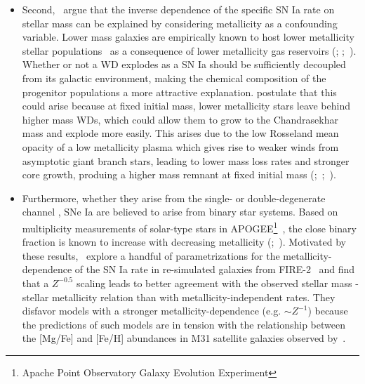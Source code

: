 \documentclass[ms.tex]{subfiles}
\begin{document}
\begin{itemize}
	\item Second,~\citet{Kistler2013} argue that the inverse dependence of the
	specific SN Ia rate on stellar mass can be explained by considering
	metallicity as a confounding variable.
	Lower mass galaxies are empirically known to host lower metallicity stellar
	populations~\citep{Gallazzi2005, Kirby2013} as a consequence of lower
	metallicity gas reservoirs (\citealp{Tremonti2004, Andrews2013};
	\citealp*{Zahid2011};~\citealp{Zahid2014}).
	Whether or not a WD explodes as a SN Ia should be sufficiently decoupled
	from its galactic environment, making the chemical composition of the
	progenitor populations a more attractive explanation.
	\citet{Kistler2013} postulate that this could arise because at fixed
	initial mass, lower metallicity stars leave behind higher mass WDs, which
	could allow them to grow to the Chandrasekhar mass and explode more easily.
	This arises due to the low Rosseland mean opacity of a low metallicity
	plasma which gives rise to weaker winds from asymptotic giant branch stars,
	leading to lower mass loss rates and stronger core growth, produing a
	higher mass remnant at fixed initial mass (\citealp{Umeda1999, Willson2000,
	Marigo2007};~\citealp*{Meng2008};~\citealp{Zhao2012, Kalirai2014}).

	\item Furthermore, whether they arise from the single-
	\citep[e.g.][]{Whelan1973} or double-degenerate channel
	\citep[e.g.][]{Iben1984, Webbink1984}, SNe Ia are believed to arise from
	binary star systems.
	Based on multiplicity measurements of solar-type stars in APOGEE\footnote{
		Apache Point Observatory Galaxy Evolution Experiment
	}~\citep{Majewski2017}, the close binary fraction is known to increase
	with decreasing metallicity (\citealp{Badenes2018};~\citealp*{Moe2019}).
	Motivated by these results,~\citet{Gandhi2022} explore a handful of
	parametrizations for the metallicity-dependence of the SN Ia rate in
	re-simulated galaxies from FIRE-2~\citep{Hopkins2018} and find that a
	$Z^{-0.5}$ scaling leads to better agreement with the observed stellar
	mass - stellar metallicity relation than with metallicity-independent
	rates.
	They disfavor models with a stronger metallicity-dependence (e.g.
	$\sim Z^{-1}$) because the predictions of such models are in tension
	with the relationship between the [Mg/Fe] and [Fe/H] abundances in M31
	satellite galaxies observed by~\citet*{Vargas2014}.


\end{itemize}
\end{document}
